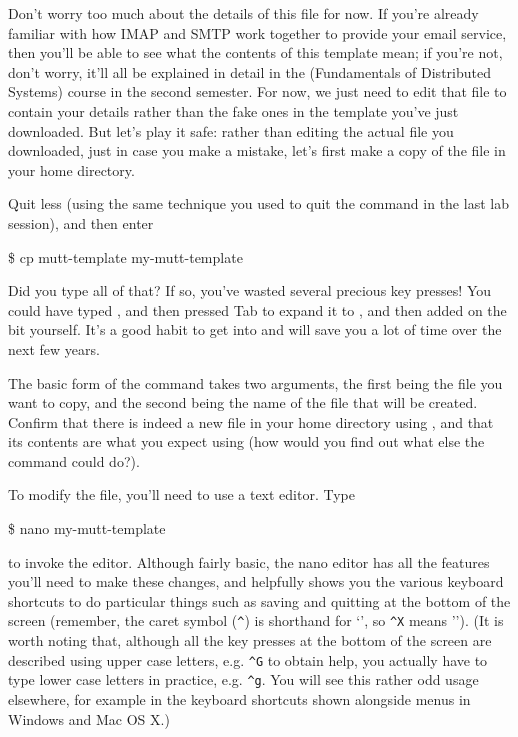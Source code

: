 Don't worry too much about the details of this file for now. If you're already familiar with how IMAP and SMTP work together to provide your email service, then you'll be able to see what the contents of this template mean; if you're not, don't worry, it'll all be explained in detail in the  (Fundamentals of Distributed Systems) course in the second semester. For now, we just need to edit that file to contain your details rather than the fake ones in the template you've just downloaded. But let's play it safe: rather than editing the actual file you downloaded, just in case you make a mistake, let's first make a copy of the file in your home directory. 


Quit less (using the same technique you used to quit the  command in the last lab session), and then enter

\begin{ttoutenv}
\$ cp mutt-template my-mutt-template
\end{ttoutenv}

Did you type all of that? If so, you've wasted several precious key presses! You could have typed , and then pressed Tab to expand it to , and then added on the  bit yourself. It's a good habit to get into and will save you a lot of time over the next few years.

The basic form of the  command takes two arguments, the first being the file you want to copy, and the second being the name of the file that will be created. Confirm that there is indeed a new file in your home directory using , and that its contents are what you expect using  (how would you find out what else the  command could do?). 

To modify the file, you'll need to use a text editor. Type 
\begin{ttoutenv}
\$ nano my-mutt-template
\end{ttoutenv}

to invoke the  editor. Although fairly basic, the nano editor has all the features you'll need to make these changes, and helpfully shows you the various keyboard shortcuts to do particular things such as saving and quitting at the bottom of the screen (remember, the caret symbol (\texttt{\textasciicircum}) is shorthand for `', so \texttt{\textasciicircum X} means ''). (It is worth noting that, although all the key presses at the bottom of the screen are described using upper case letters, e.g. \texttt{\textasciicircum G} to obtain help, you actually have to type lower case letters in practice, e.g. \texttt{\textasciicircum g}. You will see this rather odd usage elsewhere, for example in the keyboard shortcuts shown alongside menus in Windows and Mac OS X.)

